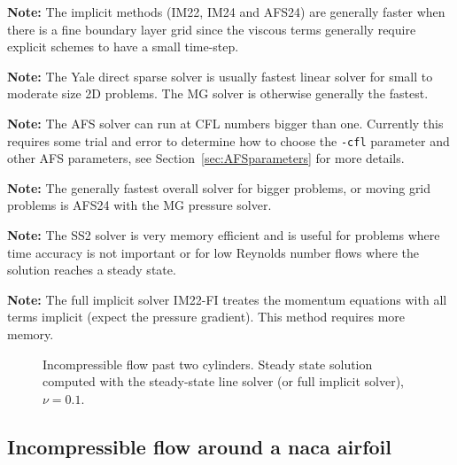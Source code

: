 \documentclass{article}
\begin{document}
{\bf Note:} The implicit methods (IM22, IM24 and AFS24) are generally faster when there is a fine boundary layer grid since the viscous terms
        generally require explicit schemes to have a small time-step. 

{\bf Note:} The Yale direct sparse solver is usually fastest linear solver for small to moderate size 2D problems. The MG solver is
      otherwise generally the fastest. 

{\bf Note:} The AFS solver can run at CFL numbers bigger than one. Currently this requires some trial and error to determine
    how to choose the {\tt -cfl} parameter and other AFS parameters, see Section~\ref{sec:AFSparameters} for more details. 

{\bf Note:} The generally fastest overall solver for bigger problems, or moving grid problems is AFS24 with the MG pressure solver. 

{\bf Note:} The SS2 solver is very memory efficient and is useful for problems where time accuracy is not important or for
    low Reynolds number flows where the solution reaches a steady state.

{\bf Note:} The full implicit solver IM22-FI treates the momentum equations with all terms implicit (expect the pressure gradient).
     This method requires more memory. 


{
\begin{figure}[hbt]
\newcommand{\figWidtha}{12.cm}
\newcommand{\trimfiga}[2]{\trimPlot{#1}{#2}{.02}{.02}{.275}{.275}}
\begin{center}
\end{center} 
\caption{Incompressible flow past two cylinders. Steady state solution computed with the steady-state line solver (or full implicit solver), $\nu=0.1$.}
  \label{fig:tcilcSteadyState}
\end{figure}
}

\subsection{Incompressible flow around a naca airfoil}
\end{document}
